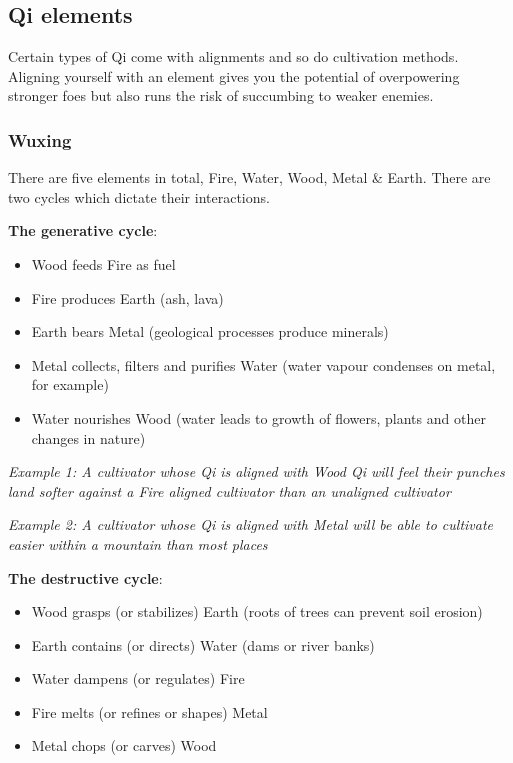 \subsection{Qi elements}
Certain types of Qi come with alignments and so do cultivation methods. Aligning yourself with an element gives you the potential of overpowering stronger foes but also runs the risk of succumbing to weaker enemies. 

\subsubsection{Wuxing}

There are five elements in total, Fire, Water, Wood, Metal \& Earth. There are two cycles which dictate their interactions. 

\textbf{The generative cycle}: 
\begin{itemize}
    \item Wood feeds Fire as fuel
    \item Fire produces Earth (ash, lava)
    \item Earth bears Metal (geological processes produce minerals)
    \item Metal collects, filters and purifies Water (water vapour condenses on metal, for example)
    \item Water nourishes Wood (water leads to growth of flowers, plants and other changes in nature)
\end{itemize}

\textit{Example 1: A cultivator whose Qi is aligned with Wood Qi will feel their punches land softer against a Fire aligned cultivator than an unaligned cultivator}

\textit{Example 2: A cultivator whose Qi is aligned with Metal will be able to cultivate easier within a mountain than most places}

\textbf{The destructive cycle}: 
\begin{itemize}
    \item Wood grasps (or stabilizes) Earth (roots of trees can prevent soil erosion)
    \item Earth contains (or directs) Water (dams or river banks)
    \item Water dampens (or regulates) Fire
    \item Fire melts (or refines or shapes) Metal
    \item Metal chops (or carves) Wood
\end{itemize}

